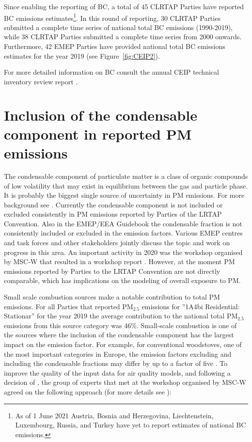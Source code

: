 Since enabling the reporting of BC, a total of 45 CLRTAP Parties have reported BC emissions estimates\footnote{ As of 1 June 2021  Austria, Bosnia and Herzegovina, Liechtenstein, Luxembourg, Russia, and Turkey have yet to report estimates of national BC emissions.}. In this round of reporting, 30 CLRTAP Parties submitted a complete time series of national total BC emissions (1990-2019), while 38 CLRTAP Parties submitted a complete time series from 2000 onwards. Furthermore, 42 EMEP Parties have provided national total BC emissions estimates for the year 2019 (see Figure~\ref{fig:CEIP2}).

For more detailed information on BC consult the annual CEIP technical inventory review report \citep{CEIP2020}.


\section{Inclusion of the condensable component in reported PM emissions}
\label{sec:EmisSVOC}

The condensable component of particulate matter is a class of organic compounds of low volatility that may exist in equilibrium between the gas and particle phase. It is probably the biggest single source of uncertainty in PM emissions. For more background see \citep{CONDws2020}.
Currently the condensable component is not included or excluded consistently in PM emissions reported by Parties
of the LRTAP Convention. Also in the EMEP/EEA Guidebook \citep{EmisInvGuide2019} the condensable fraction is not consistently included or
excluded in the emission factors. Various EMEP centres and task forces and other stakeholders jointly discuss the topic and work on progress in this area. An important activity in 2020 was the workshop organised by MSC-W that resulted in a workshop report \citep{CONDws2020}. However, at the moment PM emissions reported by Parties to the LRTAP Convention are not directly
comparable, which has implications on the modeling of overall exposure to PM.

Small scale combustion sources make a notable contribution to total PM emissions. For all Parties that reported PM$_{2.5}$ emissions for ''1A4bi Residential: Stationar'' for the year 2019 the average contribution to the national total PM$_{2.5}$ emissions from this source category was 46\%. Small-scale combustion is one of the sources where the inclusion of the condensable component has the largest impact on the emission factor. For example, for conventional woodstoves, one of the most important categories in Europe, the emission factors excluding and including the condensable fractions may differ by up to a factor of five \citep{DeniervanderGon2015}.
To improve the quality of the input data for air quality models, and following a decision of \citet{EMEPBureaux2020}, the group of experts that met at the workshop organised by MSC-W agreed on the following approach (for more details see \citet{CONDws2020}): 

